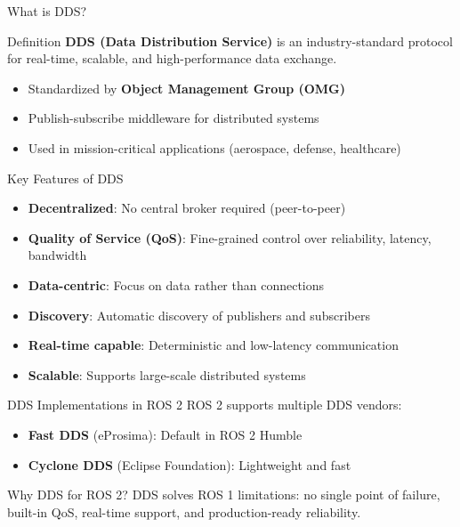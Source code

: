 \begin{frame}[allowframebreaks]{What is DDS?}
    \begin{block}{Definition}
        \textbf{DDS (Data Distribution Service)} is an industry-standard protocol for real-time, scalable, and high-performance data exchange.
        \begin{itemize}
            \item Standardized by \textbf{Object Management Group (OMG)}
            \item Publish-subscribe middleware for distributed systems
            \item Used in mission-critical applications (aerospace, defense, healthcare)
        \end{itemize}
    \end{block}

    \framebreak

    \begin{block}{Key Features of DDS}
        \begin{itemize}
            \item \textbf{Decentralized}: No central broker required (peer-to-peer)
            \item \textbf{Quality of Service (QoS)}: Fine-grained control over reliability, latency, bandwidth
            \item \textbf{Data-centric}: Focus on data rather than connections
            \item \textbf{Discovery}: Automatic discovery of publishers and subscribers
            \item \textbf{Real-time capable}: Deterministic and low-latency communication
            \item \textbf{Scalable}: Supports large-scale distributed systems
        \end{itemize}
    \end{block}

    \framebreak

    \begin{block}{DDS Implementations in ROS 2}
        ROS 2 supports multiple DDS vendors:
        \begin{itemize}
            \item \textbf{Fast DDS} (eProsima): Default in ROS 2 Humble
            \item \textbf{Cyclone DDS} (Eclipse Foundation): Lightweight and fast
        \end{itemize}
    \end{block}

    \begin{alertblock}{Why DDS for ROS 2?}
        DDS solves ROS 1 limitations: no single point of failure, built-in QoS, real-time support, and production-ready reliability.
    \end{alertblock}
\end{frame}

